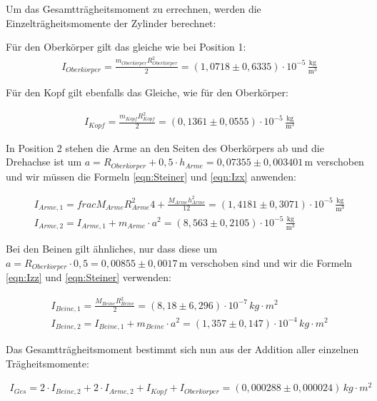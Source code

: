 Um das Gesamtträgheitsmoment zu errechnen, werden die Einzelträgheitsmomente der Zylinder berechnet:

Für den Oberkörper gilt das gleiche wie bei Position 1:
\begin{align*}
  & I_{Oberk\ddot{o}rper} = \frac{m_{Oberk\ddot{o}rper}R_{Oberk\ddot{o}rper}^2}{2} = (1{,}0718 \pm 0{,}6335) \cdot 10^{-5} \, \mathrm{\frac{kg}{m^3}}
\end{align*}

Für den Kopf gilt ebenfalls das Gleiche, wie für den Oberkörper:

\begin{align*}
  & I_{Kopf} = \frac{m_{Kopf}R_{Kopf}^2}{2} = (0{,}1361 \pm 0{,}0555) \cdot 10^{-5} \, \mathrm{\frac{kg}{m^3}}
\end{align*}

In Position 2 stehen die Arme an den Seiten des Oberkörpers ab und die Drehachse ist um $a = R_{Oberk\ddot{o}rper} + 0,5 \cdot h_{Arme} = 0{,}07355 \pm 0{,}003401 \, \mathrm{m}$
verschoben und wir müssen die Formeln \ref{eqn:Steiner} und \ref{eqn:Izx} anwenden:

\begin{align*}
  & I_{Arme,1} = frac{M_{Arme}R_{Arme}^2}{4} + \frac{M_{Arme}h_{Arme}^2}{12} = (1{,}4181 \pm 0{,}3071) \cdot 10^{-5} \, \mathrm{\frac{kg}{m^3}} \\
  & I_{Arme,2} = I_{Arme,1} + m_{Arme} \cdot a^2 = (8{,}563 \pm 0{,}2105) \cdot 10^{-5} \, \mathrm{\frac{kg}{m^3}}
\end{align*}

Bei den Beinen gilt ähnliches, nur dass diese um $a = R_{Oberk\ddot{o}rper} \cdot 0{,}5 = 0{,}00855 \pm 0{,}0017 \, \mathrm{m}$ verschoben sind
und wir die Formeln \ref{eqn:Izz} und \ref{eqn:Steiner} verwenden:

\begin{align*}
  & I_{Beine,1} = \frac{M_{Beine}R_{Beine}^2}{2} = (8,18 \pm 6,296) \cdot 10^{-7} \, kg \cdot m^2 \\
  & I_{Beine,2} = I_{Beine,1} + m_{Beine} \cdot a^2 = (1,357 \pm 0,147) \cdot 10^{-4} \, kg \cdot m^2
\end{align*}

Das Gesamtträgheitsmoment bestimmt sich nun aus der Addition aller einzelnen Trägheitsmomente:

\begin{align}
  I_{Ges} = 2 \cdot I_{Beine,2} + 2 \cdot I_{Arme,2} + I_{Kopf} + I_{Oberk\ddot{o}rper} = (0{,}000288 \pm 0{,}000024) \, kg \cdot m^2
\end{align}

